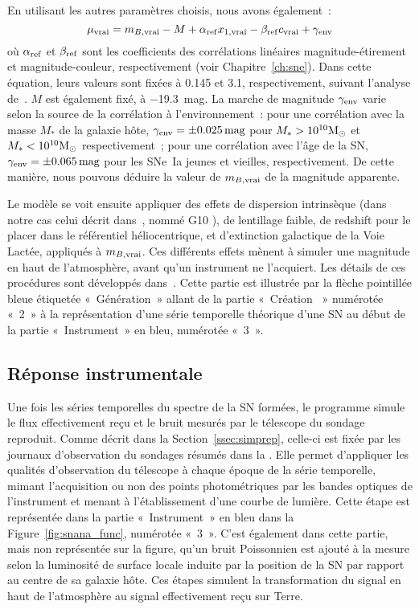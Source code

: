 \documentclass[../main/main.tex]{subfiles}
\begin{document}
En utilisant les autres paramètres choisis, nous avons également~:
\begin{equation}\label{eq:mutrue}
    \mu_{\rm vrai} = m_{B, \rm vrai} - M + \alpha_{\rm ref} x_{1, \rm vrai} -
    \beta_{\rm ref} c_{\rm vrai}+ \gamma_{\rm env}
\end{equation}
où $\alpha_{\rm ref}$ et $\beta_{\rm ref}$ sont les coefficients des
corrélations linéaires magnitude-étirement et magnitude-couleur, respectivement
(voir Chapitre~\ref{ch:sne}). Dans cette équation, leurs valeurs sont fixées à
\num{0.145} et \num{3.1}, respectivement, suivant l'analyse
de~\cite{popovic2021a}. $M$ est également fixé, à \SI{-19.3}{mag}. La marche de
magnitude $\gamma_{\rm env}$ varie selon la source de la corrélation à l'environnement~:
pour une corrélation avec la masse $M_*$ de la galaxie hôte, $\gamma_{\rm env} =
\pm \SI{0.025}{mag}$ pour $M_* > 10^{10}\si{\Msun}$ et $M_* < 10^{10}\si{\Msun}$
respectivement~; pour une corrélation avec l'âge de la SN, $\gamma_{\rm env} =
\pm \SI{0.065}{mag}$ pour les SNe~Ia jeunes et vieilles, respectivement. De
cette manière, nous pouvons déduire la valeur de $m_{B, \rm vrai}$ de la
magnitude apparente.

Le modèle se voit ensuite appliquer des effets de dispersion intrinsèque (dans
notre cas celui décrit dans~\cite{guy2010}, nommé G10
), de lentillage faible, de redshift pour le placer
dans le référentiel héliocentrique, et d'extinction galactique de la Voie
Lactée, appliqués à $m_{B, \rm vrai}$. Ces différents effets mènent à simuler
une magnitude en haut de l'atmosphère, avant qu'un instrument ne l'acquiert. Les
détails de ces procédures sont développés dans~\cite{kessler2019}. Cette partie
est illustrée par la flèche pointillée bleue étiquetée «~Génération~» allant de
la partie «~Création \hostlib~» numérotée «~2~» à la représentation d'une série
temporelle théorique d'une SN au début de la partie «~Instrument~» en bleu,
numérotée «~3~».

\subsection{Réponse instrumentale}\label{ssec:siminst}

Une fois les séries temporelles du spectre de la SN formées, le programme simule
le flux effectivement reçu et le bruit mesurés par le télescope du sondage
reproduit. Comme décrit dans la Section~\ref{ssec:simprep}, celle-ci est fixée
par les journaux d'observation du sondages résumés dans la \simlib. Elle permet
d'appliquer les qualités d'observation du télescope à chaque époque de la série
temporelle, mimant l'acquisition ou non des points photométriques par les bandes
optiques de l'instrument et menant à l'établissement d'une courbe de lumière.
Cette étape est représentée dans la partie «~Instrument~» en bleu dans la
Figure~\ref{fig:snana_func}, numérotée «~3~». C'est également dans cette partie,
mais non représentée sur la figure, qu'un bruit Poissonnien est ajouté à la
mesure selon la luminosité de surface locale induite par la position de la SN
par rapport au centre de sa galaxie hôte. Ces étapes simulent la transformation
du signal en haut de l'atmosphère au signal effectivement reçu sur Terre.
\end{document}
